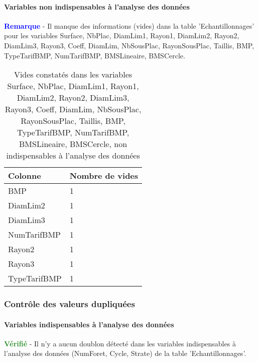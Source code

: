 \documentclass[a4paper]{article}
\begin{document}
\paragraph{Variables non indispensables à l'analyse des données}
\textcolor{blue}{\textbf{Remarque}} - Il manque des informations (vides) dans la table 'Echantillonnages' pour les variables Surface, NbPlac, DiamLim1, Rayon1, DiamLim2, Rayon2, DiamLim3, Rayon3, Coeff, DiamLim, NbSousPlac, RayonSousPlac, Taillis, BMP, TypeTarifBMP, NumTarifBMP, BMSLineaire, BMSCercle. \\ 

\begin{table}[ht]
\centering
\begingroup\scriptsize
\begin{tabular}{|M{2cm}|M{1cm}|}
  \hline
Colonne & Nombre de vides \\ 
  \hline
BMP & 1 \\ 
   \hline
DiamLim2 & 1 \\ 
   \hline
DiamLim3 & 1 \\ 
   \hline
NumTarifBMP & 1 \\ 
   \hline
Rayon2 & 1 \\ 
   \hline
Rayon3 & 1 \\ 
   \hline
TypeTarifBMP & 1 \\ 
   \hline
\end{tabular}
\endgroup
\caption{\footnotesize{Vides constatés dans les variables Surface, NbPlac, DiamLim1, Rayon1, DiamLim2, Rayon2, DiamLim3, Rayon3, Coeff, DiamLim, NbSousPlac, RayonSousPlac, Taillis, BMP, TypeTarifBMP, NumTarifBMP, BMSLineaire, BMSCercle, non indispensables à l'analyse des données}} 
\label{Echantillonnages-missing_values_for_non_essential_vars}
\end{table}
\FloatBarrier
\subsubsection{Contrôle des valeurs dupliquées}
\paragraph{Variables indispensables à l'analyse des données}
\textcolor{ForestGreen}{\textbf{Vérifié}} - Il n'y a aucun doublon détecté dans les variables indispensables à l'analyse des données (NumForet, Cycle, Strate) de la table 'Echantillonnages'. \\ 
\end{document}
